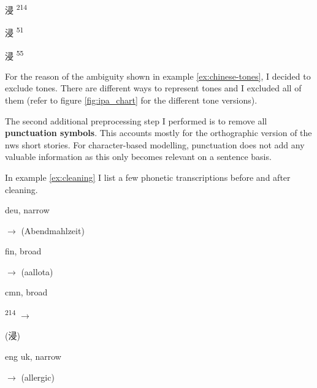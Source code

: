 \begin{covsubexamples}
\label{ex:chinese-tones}
\item 
\begin{CJK*}{UTF8}{bsmi}
浸 \>\>\>\> \textsuperscript{2}\textsuperscript{1}\textsuperscript{4}
\end{CJK*}
\item 
\begin{CJK*}{UTF8}{bsmi}
浸 \>\>\>\> \textsuperscript{5}\textsuperscript{1}
\end{CJK*}
\item  
\begin{CJK*}{UTF8}{bsmi}
浸 \>\>\>\> \textsuperscript{5}\textsuperscript{5}
\end{CJK*}
\end{covsubexamples}

For the reason of the ambiguity shown in example \ref{ex:chinese-tones}, I decided to exclude tones. There are different ways to represent tones and I excluded all of them (refer to figure \ref{fig:ipa_chart} for the different tone versions). 

The second additional preprocessing step I performed is to remove all \textbf{punctuation symbols}. This accounts mostly for the orthographic version of the \ac{nws} short stories. For character-based modelling, punctuation does not add any valuable information as this only becomes relevant on a sentence basis. 

In example \ref{ex:cleaning} I list a few phonetic transcriptions before and after cleaning. 

\begin{covsubexamples}[preamble={This example shows strings from the WikiPron data before and after cleaning them. The left-hand side of the arrows shows the uncleaned version and the right-hand side the cleaned version. I added the language code and the transcription type and the original grapheme sequence in parentheses.}]
\label{ex:cleaning}
\item deu, narrow

 $\rightarrow$  (Abendmahlzeit)
\item fin, broad

  $\rightarrow$  (aallota)
\item cmn, broad

 \textsuperscript{2}\textsuperscript{1}\textsuperscript{4} $\rightarrow$ 
\begin{CJK*}{UTF8}{bsmi}
(浸)
\end{CJK*}
\item eng uk, narrow

 $\rightarrow$  (allergic)
\end{covsubexamples}

